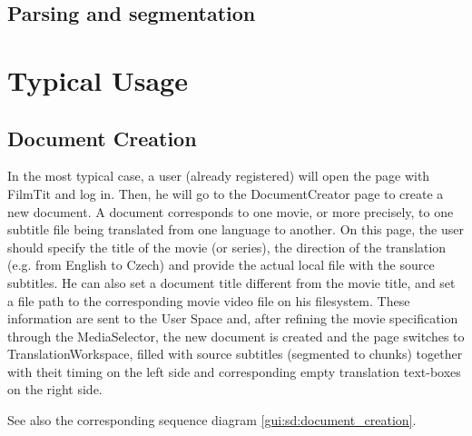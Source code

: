 \subsection{Parsing and segmentation}

\section{Typical Usage}


\subsection{Document Creation}

In the most typical case, a user (already registered) will open the page with FilmTit and log in. Then, he will go to the DocumentCreator page to create a new document. A document corresponds to one movie, or more precisely, to one subtitle file being translated from one language to another. On this page, the user should specify the title of the movie (or series), the direction of the translation (e.g. from English to Czech) and provide the actual local file with the source subtitles. He can also set a document title different from the movie title, and set a file path to the corresponding movie video file on his filesystem.
These information are sent to the User Space and, after refining the movie specification through the MediaSelector, the new document is created and the page switches to TranslationWorkspace, filled with source subtitles (segmented to chunks) together with theit timing on the left side and corresponding empty translation text-boxes on the right side.

See also the corresponding sequence diagram \ref{gui:sd:document_creation}.

